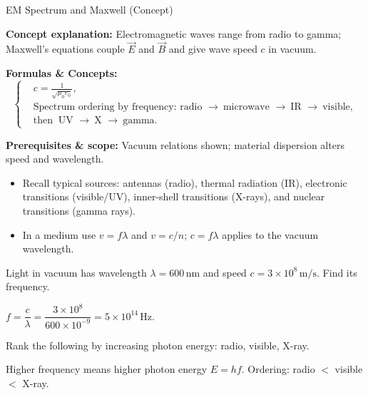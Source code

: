 \begin{KnowledgePoint}{EM Spectrum and Maxwell (Concept) \Core}
  \KPFormulas
  \begin{formulabox}
  \textbf{Concept explanation:} Electromagnetic waves range from radio to gamma; Maxwell's equations couple $\vec E$ and $\vec B$ and give wave speed $c$ in vacuum.

  \textbf{Formulas \& Concepts:}
  \[
  \left\{\begin{aligned}
    &c=\frac{1}{\sqrt{\mu_0\varepsilon_0}},\\
      &\text{Spectrum ordering by frequency: radio }\to\ \text{microwave }\to\ \text{IR }\to\ \text{visible},\\
      &\text{then }\ \text{UV }\to\ \text{X }\to\ \text{gamma}.
  \end{aligned}\right.
  \]

  \textbf{Prerequisites \& scope:} Vacuum relations shown; material dispersion alters speed and wavelength.
  \end{formulabox}

  \KPHeuristics
  \begin{heuristicsbox}
  \begin{itemize}[leftmargin=*]
    \item Recall typical sources: antennas (radio), thermal radiation (IR), electronic transitions (visible/UV), inner-shell transitions (X-rays), and nuclear transitions (gamma rays).
    \item In a medium use $v=f\lambda$ and $v=c/n$; $c=f\lambda$ applies to the vacuum wavelength.
  \end{itemize}
  \end{heuristicsbox}

  \KPProblems
\begin{cheatproblem}
  Light in vacuum has wavelength $\lambda=600\,\text{nm}$ and speed $c=3\times10^8\,\text{m/s}$. Find its frequency.
\begin{solutionbox}
  $f=\dfrac{c}{\lambda}=\dfrac{3\times10^8}{600\times10^{-9}}=5\times10^{14}\,\text{Hz}$.
\end{solutionbox}
\end{cheatproblem}
\begin{cheatproblem}
  Rank the following by increasing photon energy: radio, visible, X-ray.
\begin{solutionbox}
  Higher frequency means higher photon energy $E=hf$. Ordering: radio $<$ visible $<$ X-ray.
\end{solutionbox}
\end{cheatproblem}
\end{KnowledgePoint}


